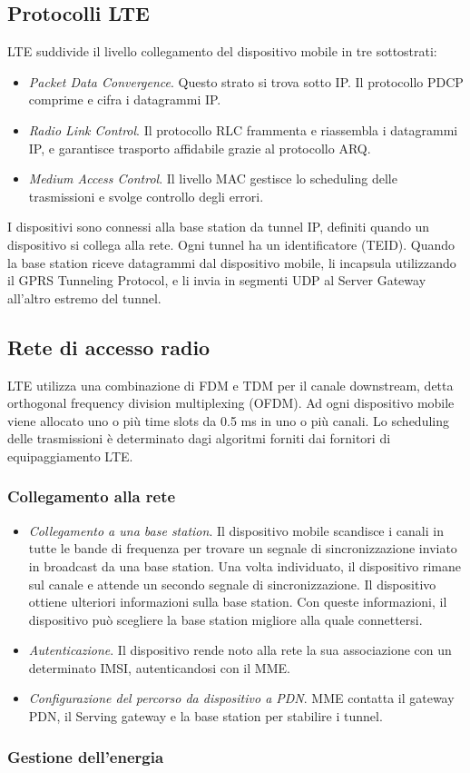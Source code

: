 \documentclass[11pt]{book}
\begin{document}
\subsection{Protocolli LTE}
LTE suddivide il livello collegamento del dispositivo mobile in tre sottostrati:
\begin{itemize}
    \item \textit{Packet Data Convergence}. Questo strato si trova sotto IP. Il protocollo PDCP comprime e cifra i datagrammi 
    IP.
    \item \textit{Radio Link Control}. Il protocollo RLC frammenta e riassembla i datagrammi IP, e garantisce trasporto 
    affidabile grazie al protocollo ARQ. 
    \item \textit{Medium Access Control}. Il livello MAC gestisce lo scheduling delle trasmissioni e svolge controllo degli 
    errori.
\end{itemize}
I dispositivi sono connessi alla base station da tunnel IP, definiti quando un dispositivo si collega alla rete. Ogni tunnel 
ha un identificatore (TEID). Quando la base station riceve datagrammi dal dispositivo mobile, li incapsula utilizzando il 
GPRS Tunneling Protocol, e li invia in segmenti UDP al Server Gateway all'altro estremo del tunnel.
\subsection{Rete di accesso radio}
LTE utilizza una combinazione di FDM e TDM per il canale downstream, detta orthogonal frequency division multiplexing (OFDM). 
Ad ogni dispositivo mobile viene allocato uno o più time slots da 0.5 ms in uno o più canali. Lo scheduling delle trasmissioni 
è determinato dagi algoritmi forniti dai fornitori di equipaggiamento LTE.
\subsubsection{Collegamento alla rete}
\begin{itemize}
    \item \textit{Collegamento a una base station}. Il dispositivo mobile scandisce i canali in tutte le bande di frequenza 
    per trovare un segnale di sincronizzazione inviato in broadcast da una base station. Una volta individuato, il dispositivo 
    rimane sul canale e attende un secondo segnale di sincronizzazione. Il dispositivo ottiene ulteriori informazioni sulla 
    base station. Con queste informazioni, il dispositivo può scegliere la base station migliore alla quale connettersi.
    \item \textit{Autenticazione}. Il dispositivo rende noto alla rete la sua associazione con un determinato IMSI, autenticandosi 
    con il MME.
    \item \textit{Configurazione del percorso da dispositivo a PDN}. MME contatta il gateway PDN, il Serving gateway e la 
    base station per stabilire i tunnel.
\end{itemize}
\subsubsection{Gestione dell'energia}
\end{document}

